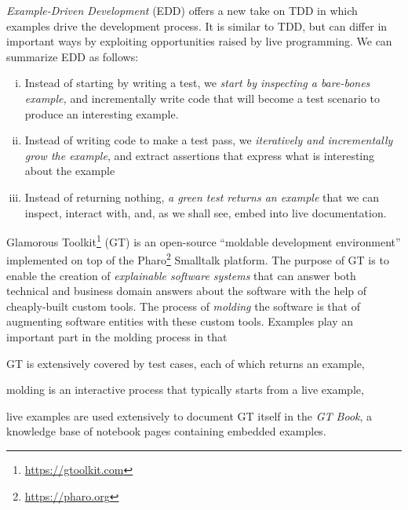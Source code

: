 \documentclass[acmsmall,screen,authorversion,nonacm]{acmart} %
\begin{document}
\emph{Example-Driven Development} (EDD) offers a new take on TDD in which examples drive the development process.
It is similar to TDD, but can differ in important ways by exploiting opportunities raised by live programming.
We can summarize EDD as follows:
\begin{enumerate}[(i)]
	\item Instead of starting by writing a test, we \emph{start by inspecting a bare-bones example,} and incrementally write code that will become a test scenario to produce an interesting example.
	\item Instead of writing code to make a test pass, we \emph{iteratively and incrementally grow the example}, and extract assertions that express what is interesting about the example
	\item Instead of returning nothing, \emph{a green test returns an example} that we can inspect, interact with, and, as we shall see, embed into live documentation.
\end{enumerate}



Glamorous Toolkit\footnote{\url{https://gtoolkit.com}} (GT) is an open-source ``moldable development environment'' implemented on top of the Pharo\footnote{\url{https://pharo.org}} Smalltalk  platform.
The purpose of GT is to enable the creation of \emph{explainable software systems} that can answer both technical and business domain answers about the software with the help of cheaply-built custom tools.
The process of \emph{molding} the software is that of augmenting software entities with these custom tools.
Examples play an important part in the molding process in that
\begin{inparaenum}[(i)]
	\item GT is extensively covered by test cases, each of which returns an example,
	\item molding is an interactive process that typically starts from a live example,
	\item live examples are used extensively to document GT itself in the \emph{GT Book}, a knowledge base of notebook pages containing embedded examples.
\end{inparaenum}
\end{document}
